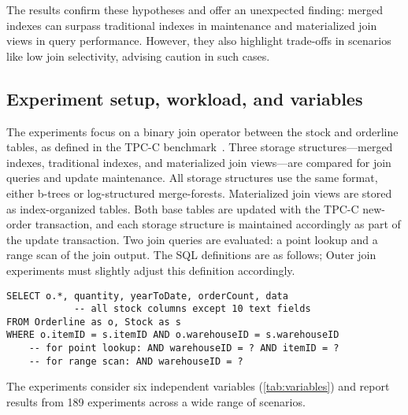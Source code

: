 \documentclass[biblatex, english]{lni}
\begin{document}
The results confirm these hypotheses and offer an unexpected finding: merged indexes can surpass traditional indexes in maintenance and materialized join views in query performance.
However, they also highlight trade-offs in scenarios like low join selectivity, advising caution in such cases.

\subsection{Experiment setup, workload, and variables}\label{ssec:setup}

The experiments focus on a binary join operator between the stock and orderline tables, as defined in the TPC-C benchmark~\cite{tpc2010benchmark}.
Three storage structures---merged indexes, traditional indexes, and materialized join views---are compared for join queries and update maintenance.
All storage structures use the same format, either b-trees or log-structured merge-forests. Materialized join views are stored as index-organized tables.
Both base tables are updated with the TPC-C new-order transaction, and each storage structure is maintained accordingly as part of the update transaction.
Two join queries are evaluated: a point lookup and a range scan of the join output.
The SQL definitions are as follows; Outer join experiments must slightly adjust this definition accordingly.

{\footnotesize
\begin{verbatim}
SELECT o.*, quantity, yearToDate, orderCount, data
            -- all stock columns except 10 text fields
FROM Orderline as o, Stock as s
WHERE o.itemID = s.itemID AND o.warehouseID = s.warehouseID
    -- for point lookup: AND warehouseID = ? AND itemID = ?
    -- for range scan: AND warehouseID = ?
\end{verbatim}
}

The experiments consider six independent variables (\cref{tab:variables}) and report results from 189 experiments across a wide range of scenarios.
\end{document}
